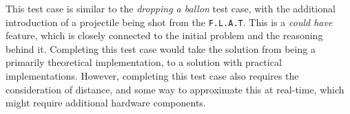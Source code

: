 This test case is similar to the \textit{dropping a ballon} test case, with the additional introduction of a projectile being shot from the \texttt{F.L.A.T}.
This is a \textit{could have} feature, which is closely connected to the initial problem and the reasoning behind it.
Completing this test case would take the solution from being a primarily theoretical implementation, to a solution with practical implementations.
However, completing this test case also requires the consideration of distance, and some way to approximate this at real-time, which might require additional hardware components.
